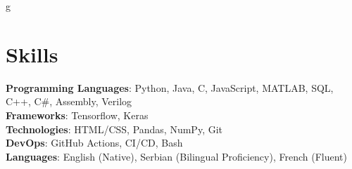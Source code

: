 g%
\section{Skills}
    \begin{itemize}[leftmargin=0.15in, label={}]
	\small{\item{
		\textbf{Programming Languages}{: Python, Java, C, JavaScript, MATLAB, SQL, C++, C\#, Assembly, Verilog} \\
		\textbf{Frameworks}{: Tensorflow, Keras} \\
		\textbf{Technologies}{: HTML/CSS, Pandas, NumPy, Git} \\
		\textbf{DevOps}{: GitHub Actions, CI/CD, Bash} \\
		\textbf{Languages}{: English (Native), Serbian (Bilingual Proficiency), French (Fluent)} \\

	}}
    \end{itemize}
